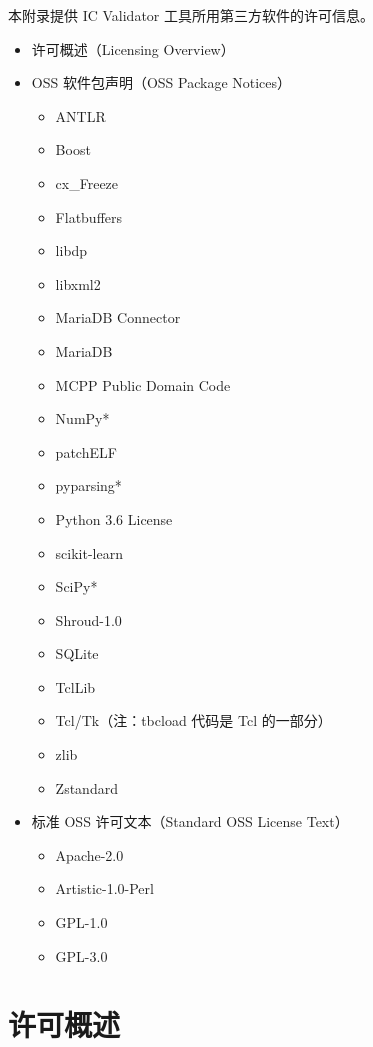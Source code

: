 \label{app:f}

本附录提供 IC Validator 工具所用第三方软件的许可信息。
\begin{itemize}
  \item 许可概述（Licensing Overview）
  \item OSS 软件包声明（OSS Package Notices）
  \begin{itemize}
    \item ANTLR
    \item Boost
    \item cx\_Freeze
    \item Flatbuffers
    \item libdp
    \item libxml2
    \item MariaDB Connector
    \item MariaDB
    \item MCPP Public Domain Code
    \item NumPy*
    \item patchELF
    \item pyparsing*
    \item Python 3.6 License
    \item scikit-learn
    \item SciPy*
    \item Shroud-1.0
    \item SQLite
    \item TclLib
    \item Tcl/Tk（注：tbcload 代码是 Tcl 的一部分）
    \item zlib
    \item Zstandard
  \end{itemize}
  \item 标准 OSS 许可文本（Standard OSS License Text）
  \begin{itemize}
    \item Apache-2.0
    \item Artistic-1.0-Perl
    \item GPL-1.0
    \item GPL-3.0
  \end{itemize}
\end{itemize}

\section{许可概述}
